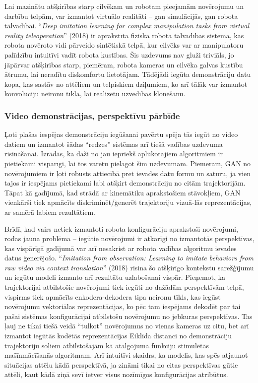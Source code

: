 \documentclass[12pt, a4paper]{article}
\numberwithin{equation}{section} %
\begin{document}
Lai mazinātu atšķirības starp cilvēkam un robotam pieejamām novērojumu un darbību telpām, var izmantot virtuālo realitāti -- gan simulācijās, gan robota tālvadībai. ``\textit{Deep imitation learning for complex manipulation tasks from virtual reality teleoperation}'' \cite{zhang2018deep} (2018) ir aprakstīta fiziska robota tālvadības sistēma, kas robota novēroto vidi pārveido sintētiskā telpā, kur cilvēks var ar manipulatoru palīdzību intuitīvi vadīt robota kustības. Šis uzdevums nav gluži triviāls, jo jāpārvar atšķirības starp, piemēram, robota kameras un cilvēka galvas kustību ātrumu, lai neradītu diskomfortu lietotājam. Tādējādi iegūta demonstrāciju datu kopa, kas sastāv no attēliem un telpiskiem dziļumiem, ko arī tālāk var izmantot konvolūciju neironu tīklā, lai realizētu uzvedības klonēšanu.

\subsubsection{Video demonstrācijas, perspektīvu pārbīde}

Ļoti plašas iespējas demonstrāciju iegūšanai pavērtu spēja tās iegūt no video datiem un izmantot šādas ``redzes'' sistēmas arī tiešā vadības uzdevuma risināšanai. Izrādās, ka daži no jau iepriekš aplūkotajiem algoritmiem ir pietiekami vispārīgi, lai tos varētu pielāgot šim uzdevumam. Piemēram, GAN no novērojumiem \cite{torabi2018generative} ir ļoti robusts attiecībā pret ievades datu formu un saturu, ja vien tajos ir iespējams pietiekami labi atšķirt demonstrāciju no citām trajektorijām. Tāpat kā gadījumā, kad strādā ar kinemātiku aprakstošiem stāvokļiem, GAN vienkārši tiek apmācīts diskriminēt/ģenerēt trajektoriju vizuā-lās reprezentācijas, ar samērā labiem rezultātiem.


Brīdī, kad vairs netiek izmantoti robota konfigurāciju aprakstoši novērojumi, rodas jauna problēma -- iegūtie novērojumi ir atkarīgi no izmantotās perspektīvas, kas vispārīgā gadījumā var arī nesakrist ar robota vadības algoritmu ievades datus ģenerējošo. ``\textit{Imitation from observation: Learning to imitate behaviors from raw video via context translation}'' \cite{liu2018imitation} (2018) risina šo atšķirīgo kontekstu sarežģījumu un iegūtu modeli izmanto arī rezultātu uzlabošanai vispār. Pieņemot, ka trajektorijai atbilstošie novērojumi tiek iegūti no dažādām perspektīvām telpā, vispirms tiek apmācīts enkodera-dekodera tipa neironu tīkls, kas iegūst novērojumu vektoriālas reprezentācijas, ko pēc tam iespējams dekodēt par tai pašai sistēmas konfigurācijai atbilstošu novērojumu no jebkuras perspektīvas. Tas ļauj ne tikai tiešā veidā ``tulkot'' novērojumus no vienas kameras uz citu, bet arī izmantot iegūtās kodētās reprezentācijas Eiklīda distanci no demonstrāciju trajektoriju soļiem atbilstošajām kā atalgojuma funkciju stimulētās mašīnmācīšanās algoritmam. Arī intuitīvi skaidrs, ka modelis, kas spēs atjaunot situācijas attēlu kādā perspektīvā, ja zināmi tikai no citas perspektīvas gūtie attēli, kaut kādā ziņā sevī ietver visus nozīmīgos konfigurācijas atribūtus.
\end{document}
